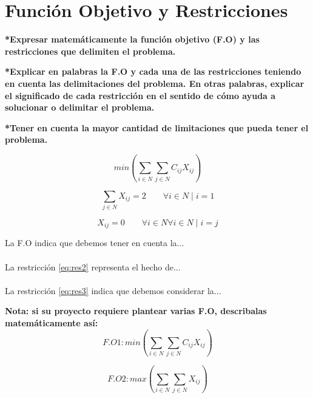 \documentclass[runningheads]{llncs}
\begin{document}
\newpage
\section{Funci\'{o}n Objetivo y Restricciones}

\textbf{*Expresar matem\'{a}ticamente la funci\'{o}n objetivo (F.O) y las restricciones que delimiten el problema.}

\textbf{*Explicar en palabras la F.O y cada una de las restricciones teniendo en cuenta las delimitaciones del problema. En otras palabras, explicar el significado de cada restricci\'{o}n en el sentido de c\'{o}mo ayuda a solucionar o delimitar el problema.}

\textbf{*Tener en cuenta la mayor cantidad de limitaciones que pueda tener el problema. }

\begin{equation}
min (\sum_{i \in N} \sum_{j \in N} C_{ij} X_{ij})
\label{eq:res1}
\end{equation}

\begin{equation}
\sum_{j \in N} X_{ij} = 2   \qquad \forall{i \in N} \mid i=1
\label{eq:res2}
\end{equation}

\begin{equation}
 X_{ij} = 0   \qquad \forall{i \in N} \forall{i \in N} \mid i=j
 \label{eq:res3}
\end{equation}

La F.O indica que debemos tener en cuenta la...
\\
\\
La restricci\'{o}n \ref{eq:res2} representa el hecho de...
\\
\\
La restricci\'{o}n \ref{eq:res3} indica que debemos considerar la...

\textbf{Nota: si su proyecto requiere plantear varias F.O, describalas matem\'{a}ticamente as\'{i}:}
\begin{equation}
F.O 1: min (\sum_{i \in N} \sum_{j \in N} C_{ij} X_{ij})
\nonumber
\label{eq:res4}
\end{equation}

\begin{equation}
F.O 2: max (\sum_{i \in N} \sum_{j \in N} X_{ij})
\label{eq:res5}
\end{equation}


%
%
%
% 
% 
%
\end{document}
